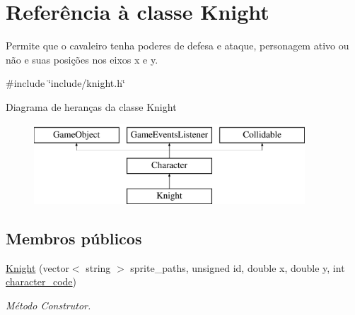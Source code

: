 \hypertarget{classKnight}{}\section{Referência à classe Knight}
\label{classKnight}


Permite que o cavaleiro tenha poderes de defesa e ataque, personagem ativo ou não e suas posições nos eixos x e y.  




{\ttfamily \#include \char`\"{}include/knight.\+h\char`\"{}}

Diagrama de heranças da classe Knight\begin{figure}[H]
\begin{center}
\leavevmode
\includegraphics[height=3.000000cm]{classKnight}
\end{center}
\end{figure}
\subsection*{Membros públicos}
\begin{DoxyCompactItemize}
\item 
\mbox{\hyperlink{classKnight_af091272d130fbfee62b308e1059e9c5e}{Knight}} (vector$<$ string $>$ sprite\+\_\+paths, unsigned id, double x, double y, int \mbox{\hyperlink{classCharacter_a3e16e9cb23edc78d774cf30925242a8e}{character\+\_\+code}})
\begin{DoxyCompactList}\small\item\em Método Construtor. \end{DoxyCompactList}\end{DoxyCompactItemize}

